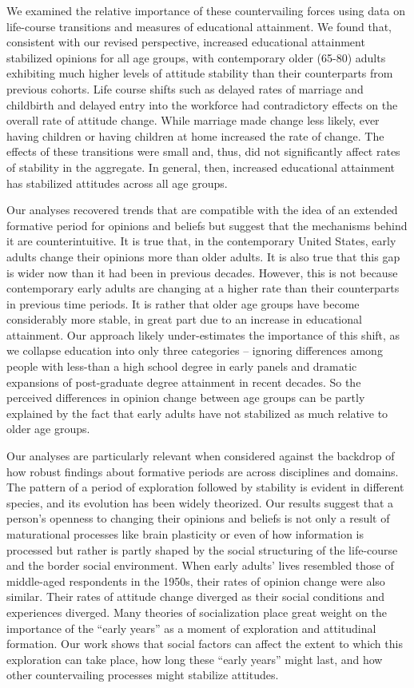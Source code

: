 \documentclass[
  12pt,
]{article}
\begin{document}
We examined the relative importance of these countervailing forces using data on life-course transitions and measures of educational attainment. We found that, consistent with our revised perspective, increased educational attainment stabilized opinions for all age groups, with contemporary older (65-80) adults exhibiting much higher levels of attitude stability than their counterparts from previous cohorts. Life course shifts such as delayed rates of marriage and childbirth and delayed entry into the workforce had contradictory effects on the overall rate of attitude change. While marriage made change less likely, ever having children or having children at home increased the rate of change. The effects of these transitions were small and, thus, did not significantly affect rates of stability in the aggregate. In general, then, increased educational attainment has stabilized attitudes across all age groups.

Our analyses recovered trends that are compatible with the idea of an extended formative period for opinions and beliefs but suggest that the mechanisms behind it are counterintuitive. It is true that, in the contemporary United States, early adults change their opinions more than older adults. It is also true that this gap is wider now than it had been in previous decades. However, this is not because contemporary early adults are changing at a higher rate than their counterparts in previous time periods. It is rather that older age groups have become considerably more stable, in great part due to an increase in educational attainment. Our approach likely under-estimates the importance of this shift, as we collapse education into only three categories -- ignoring differences among people with less-than a high school degree in early panels and dramatic expansions of post-graduate degree attainment in recent decades. So the perceived differences in opinion change between age groups can be partly explained by the fact that early adults have not stabilized as much relative to older age groups.

Our analyses are particularly relevant when considered against the backdrop of how robust findings about formative periods are across disciplines and domains. The pattern of a period of exploration followed by stability is evident in different species, and its evolution has been widely theorized. Our results suggest that a person's openness to changing their opinions and beliefs is not only a result of maturational processes like brain plasticity or even of how information is processed but rather is partly shaped by the social structuring of the life-course and the border social environment. When early adults' lives resembled those of middle-aged respondents in the 1950s, their rates of opinion change were also similar. Their rates of attitude change diverged as their social conditions and experiences diverged. Many theories of socialization place great weight on the importance of the ``early years'' as a moment of exploration and attitudinal formation. Our work shows that social factors can affect the extent to which this exploration can take place, how long these ``early years'' might last, and how other countervailing processes might stabilize attitudes.
\end{document}
